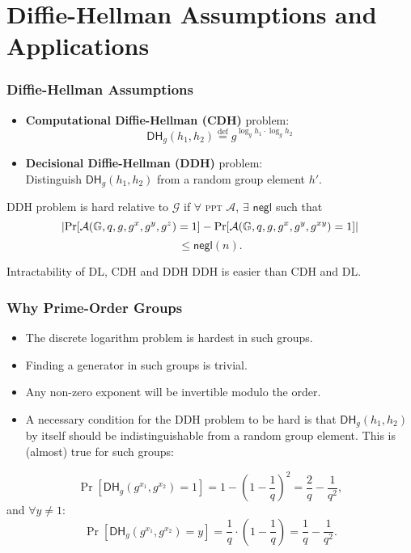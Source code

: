 \section{Diffie-Hellman Assumptions and Applications}
\begin{frame}\frametitle{Diffie-Hellman Assumptions}
\begin{itemize}
\item \textbf{Computational Diffie-Hellman (CDH)} problem:
\[ \mathsf{DH}_g(h_1,h_2) \overset{\text{def}}{=} g^{\log_gh_1\cdot \log_gh_2}\]
\item \textbf{Decisional Diffie-Hellman (DDH)} problem:	\\
Distinguish $\mathsf{DH}_g(h_1,h_2)$ from a random group element $h'$.
\end{itemize}
\begin{definition}
DDH problem is hard relative to $\mathcal{G}$ if $\forall$ \textsc{ppt} $\mathcal{A}$, $\exists$ $\mathsf{negl}$ such that
\[  \lvert\Pr[\mathcal{A}(\mathbb{G},q,g,g^x,g^y,g^z)=1] - \Pr[\mathcal{A}(\mathbb{G},q,g,g^x,g^y,g^{xy})=1]\rvert\]
\[ \le \mathsf{negl}(n). \]
\end{definition}
\begin{alertblock}{Intractability of DL, CDH and DDH}
DDH is easier than CDH and DL.
\end{alertblock}
\end{frame}
\begin{frame}\frametitle{Why Prime-Order Groups}
\begin{itemize}
\item The discrete logarithm problem is hardest in such groups.
\item Finding a generator in such groups is trivial.
\item Any non-zero exponent will be invertible modulo the order.
\item A necessary condition for the DDH problem to be hard is that $\mathsf{DH}_g(h_1,h_2)$ by itself should be indistinguishable from a random group element. This is (almost) true for such groups:
\end{itemize}
\[ \Pr[\mathsf{DH}_g(g^{x_1},g^{x_2})=1] = 1 -\left(1-\frac{1}{q}\right)^2 = \frac{2}{q} - \frac{1}{q^2}, \]
and $\forall y \neq 1:$
\[ \Pr[\mathsf{DH}_g(g^{x_1},g^{x_2})=y] = \frac{1}{q} \cdot \left(1-\frac{1}{q}\right) = \frac{1}{q} - \frac{1}{q^2}.
\]
\end{frame}
